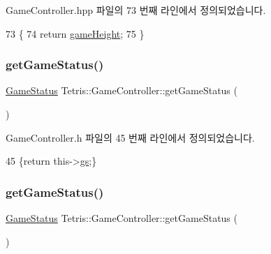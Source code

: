 Game\+Controller.\+hpp 파일의 73 번째 라인에서 정의되었습니다.


\begin{DoxyCode}
73                                          \{
74                 \textcolor{keywordflow}{return} \hyperlink{class_tetris_1_1_game_controller_a8e3adc647ed382de0ff541417bea9b33}{gameHeight};
75             \}
\end{DoxyCode}
\mbox{\label{class_tetris_1_1_game_controller_a3b95b1b7a3a18c27402100f70c1ac1ab}} 
\subsubsection{\texorpdfstring{get\+Game\+Status()}{getGameStatus()}\hspace{0.1cm}{\footnotesize\ttfamily [1/2]}}
{\footnotesize\ttfamily \hyperlink{class_tetris_1_1_game_controller_a96a963b56385f3b3a122ff0ca2beb770}{Game\+Status} Tetris\+::\+Game\+Controller\+::get\+Game\+Status (\begin{DoxyParamCaption}{ }\end{DoxyParamCaption})\hspace{0.3cm}{\ttfamily [inline]}}



Game\+Controller.\+h 파일의 45 번째 라인에서 정의되었습니다.


\begin{DoxyCode}
45 \{\textcolor{keywordflow}{return} this->\hyperlink{class_tetris_1_1_game_controller_ae4c894005a82404c73a5a9a6efb208dc}{gs};\}
\end{DoxyCode}
\mbox{\label{class_tetris_1_1_game_controller_a3b95b1b7a3a18c27402100f70c1ac1ab}} 
\subsubsection{\texorpdfstring{get\+Game\+Status()}{getGameStatus()}\hspace{0.1cm}{\footnotesize\ttfamily [2/2]}}
{\footnotesize\ttfamily \hyperlink{class_tetris_1_1_game_controller_a96a963b56385f3b3a122ff0ca2beb770}{Game\+Status} Tetris\+::\+Game\+Controller\+::get\+Game\+Status (\begin{DoxyParamCaption}{ }\end{DoxyParamCaption})\hspace{0.3cm}{\ttfamily [inline]}}

